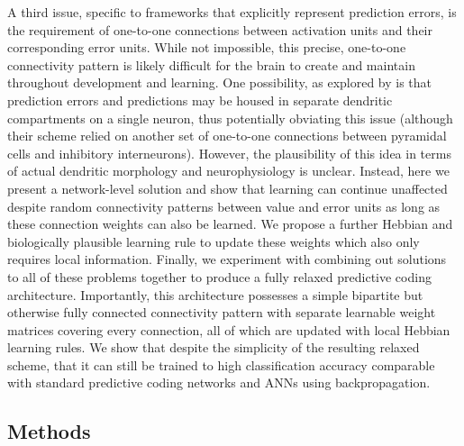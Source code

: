 A third issue, specific to frameworks that explicitly represent prediction errors, is the requirement of one-to-one connections between activation units and their corresponding error units. While not impossible, this precise, one-to-one connectivity pattern is likely difficult for the brain to create and maintain throughout development and learning. One possibility, as explored by \citet{sacramento2018dendritic} is that prediction errors and predictions may be housed in separate dendritic compartments on a single neuron, thus potentially obviating this issue (although their scheme relied on another set of one-to-one connections between pyramidal cells and inhibitory interneurons). However, the plausibility of this idea in terms of actual dendritic morphology and neurophysiology is unclear. Instead, here we present a network-level solution and show that learning can continue unaffected despite random connectivity patterns between value and error units as long as these connection weights can also be learned. We propose a further Hebbian and biologically plausible learning rule to update these weights which also only requires local information. Finally, we experiment with combining out solutions to all of these problems together to produce a fully relaxed predictive coding architecture. Importantly, this architecture possesses a simple bipartite but otherwise fully connected connectivity pattern with separate learnable weight matrices covering every connection, all of which are updated with local Hebbian learning rules. We show that despite the simplicity of the resulting relaxed scheme, that it can still be trained to high classification accuracy comparable with standard predictive coding networks and ANNs using backpropagation.

\subsection{Methods}

